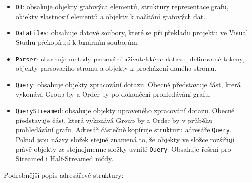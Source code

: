 \begin{itemize}

\item \texttt{DB}: obsahuje objekty grafových elementů, struktury reprezentace grafu, objekty vlastností elementů a objekty k načítání grafových dat. 

\item \texttt{DataFiles}: obsahuje datové soubory, které se při překladu projektu ve Visual Studiu překopírují k binárním souborům.

\item \texttt{Parser}: obsahuje metody parsování uživatelského dotazu, definované tokeny, objekty parsovacího stromu a objekty k procházení daného stromu.

\item \texttt{Query}: obsahuje objekty zpracování dotazu. 
Obecně představuje část, která vykonává Group by a Order by po dokončení prohledávání grafu. 

\item \texttt{QueryStreamed}: obsahuje objekty upraveného zpracování dotazu. 
Obecně představuje část, která vykonává Group by a Order by v průběhu prohledávání grafu.
Adresář částečně kopíruje strukturu adresáře \texttt{Query}.
Pokud jsou názvy složek stejné znamená to, že objekty ve složce rozšiřují právě objekty ze stejnojmenné složky uvnitř \texttt{Query}. 
Obsahuje řešení pro Streamed i Half-Streamed módy.

\end{itemize}

Podrobnější popis adresářové struktury:

